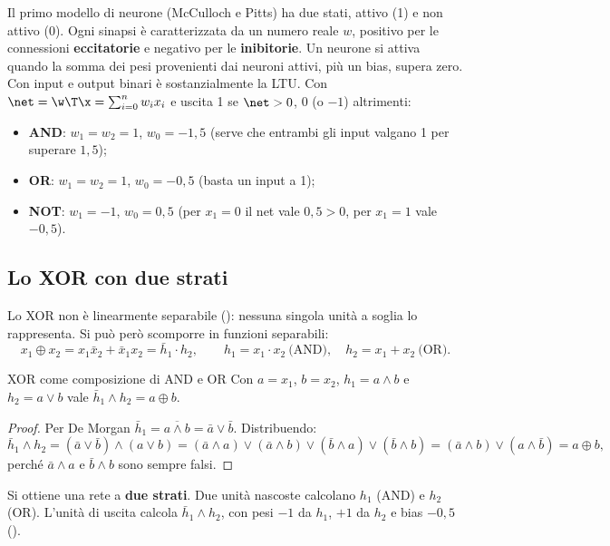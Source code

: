 Il primo modello di neurone (McCulloch e Pitts) ha due stati, attivo (1) e non attivo (0). Ogni sinapsi è
caratterizzata da un numero reale $w$, positivo per le connessioni \textbf{eccitatorie} e negativo per le
\textbf{inibitorie}. Un neurone si attiva quando la somma dei pesi provenienti dai neuroni attivi, più un bias,
supera zero. Con input e output binari è sostanzialmente la LTU. Con $\net = \w\T\x = \sum_{i=0}^nw_ix_i$ e uscita
1 se $\net>0$, 0 (o $-1$) altrimenti:
\begin{itemize}
  \item \textbf{AND}: $w_1=w_2=1$, $w_0=-1{,}5$ (serve che entrambi gli input valgano 1 per superare $1{,}5$);
  \item \textbf{OR}: $w_1=w_2=1$, $w_0=-0{,}5$ (basta un input a 1);
  \item \textbf{NOT}: $w_1=-1$, $w_0=0{,}5$ (per $x_1=0$ il net vale $0{,}5>0$, per $x_1=1$ vale $-0{,}5$).
\end{itemize}

\subsection{Lo XOR con due strati}

Lo XOR non è linearmente separabile (): nessuna singola unità a soglia lo rappresenta. Si può
però scomporre in funzioni separabili:
\[
x_1\oplus x_2 = x_1\bar x_2 + \bar x_1x_2 = \bar h_1\cdot h_2, \qquad h_1 = x_1\cdot x_2\ \text{(AND)},\quad h_2 = x_1+x_2\ \text{(OR)}.
\]

\begin{proprieta}{XOR come composizione di AND e OR}
Con $a=x_1$, $b=x_2$, $h_1 = a\wedge b$ e $h_2 = a\vee b$ vale $\bar h_1\wedge h_2 = a\oplus b$.
\end{proprieta}
\begin{proof}
Per De Morgan $\bar h_1 = \overline{a\wedge b} = \bar a\vee\bar b$. Distribuendo:
\[
\bar h_1\wedge h_2 = (\bar a\vee\bar b)\wedge(a\vee b) = (\bar a\wedge a)\vee(\bar a\wedge b)\vee(\bar b\wedge a)\vee(\bar b\wedge b) = (\bar a\wedge b)\vee(a\wedge\bar b) = a\oplus b,
\]
perché $\bar a\wedge a$ e $\bar b\wedge b$ sono sempre falsi.
\end{proof}

Si ottiene una rete a \textbf{due strati}. Due unità nascoste calcolano $h_1$ (AND) e $h_2$ (OR). L'unità di
uscita calcola $\bar h_1\wedge h_2$, con pesi $-1$ da $h_1$, $+1$ da $h_2$ e bias $-0{,}5$ ().

